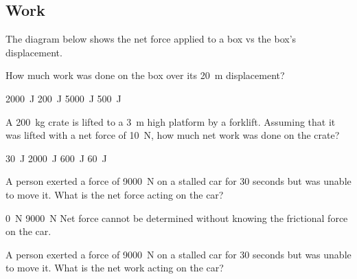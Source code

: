 \documentclass[]{exam}
\begin{document}
\subsection*{Work}

\begin{questions}

\question
The diagram below shows the net force applied to a box vs the box's displacement. 

\begin{center}
\end{center}

How much work was done on the box over its \SI{20}{m} displacement?

\begin{randomizechoices}
    \correctchoice \SI{2000}{J}
    \choice \SI{200}{J}
    \choice \SI{5000}{J}
    \choice \SI{500}{J}
\end{randomizechoices}

\question
A \SI{200}{kg} crate is lifted to a \SI{3}{m} high platform by a forklift. Assuming that it was lifted with a net force of \SI{10}{N}, how much net work was done on the crate?

\begin{randomizechoices}
    \correctchoice \SI{30}{J}
    \choice \SI{2000}{J}
    \choice \SI{600}{J}
    \choice \SI{60}{J}
\end{randomizechoices}

\question
A person exerted a force of \SI{9000}{N} on a stalled car for 30 seconds but was unable to move it. What is the net force acting on the car?

\begin{randomizechoices}[keeplast]
    \correctchoice \SI{0}{N}
    \choice \SI{9000}{N}
    \choice Net force cannot be determined without knowing the frictional force on the car.
\end{randomizechoices}

\question
A person exerted a force of \SI{9000}{N} on a stalled car for 30 seconds but was unable to move it. What is the net work acting on the car?


\end{questions}
\end{document}
